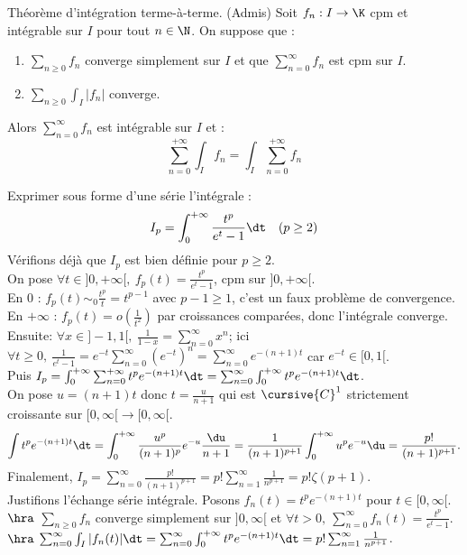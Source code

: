 \documentclass[11pt]{article}
\begin{document}
\begin{thm}{Théorème d'intégration terme-à-terme. (Admis)}{}
    Soit $f_n:I\to\K$ cpm et intégrable sur $I$ pour tout $n\in\N$. On suppose que :
    \begin{enumerate}
        \item $\sum_{n\geq0}f_n$ converge simplement sur $I$ et que $\sum_{n=0}^{\infty}f_n$ est cpm sur $I$.
        \item $\sum_{n\geq0}\int_I |f_n|$ converge.
    \end{enumerate}
    Alors $\sum_{n=0}^\infty f_n$ est intégrable sur $I$ et :
    \begin{equation*}
        \sum_{n=0}^{+\infty}\int_I f_n = \int_I \sum_{n=0}^{+\infty}f_n
    \end{equation*}
\end{thm}

\begin{ex}{}{}
    Exprimer sous forme d'une série l'intégrale :
    \begin{equation*}
        I_p = \int_0^{+\infty}\frac{t^p}{e^t-1}\dt \quad (p\geq2)
    \end{equation*}
    \tcblower
    Vérifions déjà que $I_p$ est bien définie pour $p\geq2$.\\
    On pose $\forall t \in ]0,+\infty[, ~ f_p(t)=\frac{t^p}{e^t-1}$, cpm sur $]0,+\infty[$.\\
    En 0 : $f_p(t)\sim_0\frac{t^p}{t}=t^{p-1}$ avec $p-1\geq1$, c'est un faux problème de convergence.\\
    En $+\infty$ : $f_p(t)=o(\frac{1}{t^2})$ par croissances comparées, donc l'intégrale converge.\\
    Ensuite:  $\forall x \in ]-1,1[, ~ \frac{1}{1-x}=\sum_{n=0}^\infty x^n$; ici $\forall t \geq 0, ~ \frac{1}{e^t-1}=e^{-t}\sum_{n=0}^{\infty}(e^{-t})^n=\sum_{n=0}^\infty e^{-(n+1)t}$ car $e^{-t}\in[0,1[$.\\
    Puis $I_p=\int_0^{+\infty}\sum_{n=0}^{+\infty}t^pe^{-(n+1)t}\dt=\sum_{n=0}^{\infty}\int_0^{+\infty}t^pe^{-(n+1)t}\dt$.\\
    On pose $u=(n+1)t$ donc $t=\frac{u}{n+1}$ qui est $\cursive{C}^1$ strictement croissante sur $[0,\infty[\to[0,\infty[$.
    \begin{equation*}
        \int t^p e^{-(n+1)t}\dt = \int_0^{+\infty}\frac{u^p}{(n+1)^p}e^{-u}\frac{\du}{n+1}=\frac{1}{(n+1)^{p+1}}\int_0^{+\infty}u^pe^{-u}\du=\frac{p!}{(n+1)^{p+1}}.
    \end{equation*}
    Finalement, $I_p=\sum_{n=0}^\infty\frac{p!}{(n+1)^{p+1}}=p!\sum_{n=1}^{\infty}\frac{1}{n^{p+1}}=p!\zeta(p+1)$.\\
    Justifions l'échange série intégrale. Posons $f_n(t)=t^pe^{-(n+1)t}$ pour $t\in[0,\infty[$.\\
    $\hra$ $\sum_{n\geq0} f_n$ converge simplement sur $]0,\infty[$ et $\forall t > 0, ~ \sum_{n=0}^{\infty} f_n(t)=\frac{t^p}{e^{t}-1}$.\\
    $\hra$ $\sum_{n=0}^\infty\int_I |f_n(t)|\dt=\sum_{n=0}^\infty\int_0^{+\infty}t^pe^{-(n+1)t}\dt=p!\sum_{n=1}^{\infty}\frac{1}{n^{p+1}}$.
\end{ex}
\end{document}
